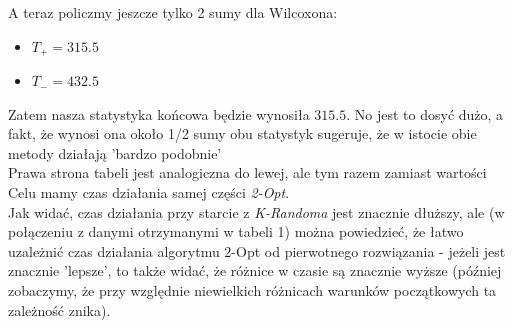 \documentclass{article}
\begin{document}
A teraz policzmy jeszcze tylko 2 sumy dla Wilcoxona:
\begin{itemize}
	\item $T_+ = 315.5$
	\item $T_- = 432.5$
\end{itemize}
Zatem nasza statystyka końcowa będzie wynosiła $315.5$. No jest to dosyć dużo, a fakt, że wynosi ona około 1/2 sumy obu statystyk sugeruje, że w istocie obie metody działają 'bardzo podobnie'\\

Prawa strona tabeli jest analogiczna do lewej, ale tym razem zamiast wartości Celu mamy czas działania samej części \textit{2-Opt}.\\
Jak widać, czas działania przy starcie z \textit{K-Randoma} jest znacznie dłuższy, ale (w połączeniu z danymi otrzymanymi w tabeli 1) można powiedzieć, że łatwo uzależnić czas działania algorytmu 2-Opt od pierwotnego rozwiązania - jeżeli jest znacznie 'lepsze', to także widać, że różnice w czasie są znacznie wyższe (później zobaczymy, że przy względnie niewielkich różnicach warunków początkowych ta zależność znika).\\

\newpage
\end{document}
